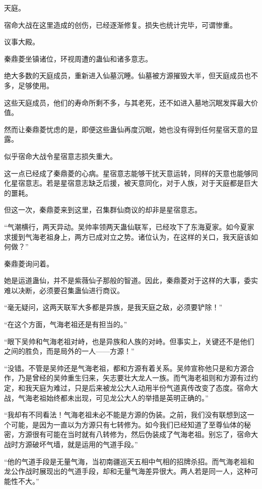 
\begin{this_body}

天庭。

宿命大战在这里造成的创伤，已经逐渐修复。损失也统计完毕，可谓惨重。

议事大殿。

秦鼎菱坐镇诸位，环视周遭的蛊仙和诸多意志。

绝大多数的天庭成员，重新进入仙墓沉睡。仙墓被方源摧毁大半，但天庭成员也不多，足够使用。

这些天庭成员，他们的寿命所剩不多，与其老死，还不如进入墓地沉眠发挥最大价值。

然而让秦鼎菱忧虑的是，即便这些蛊仙再度沉眠，她也没有得到任何星宿天意的显露。

似乎宿命大战令星宿意志损失重大。

这一点已经成了秦鼎菱的心病。星宿意志能够干扰天意运转，同样的天意也能够同化星宿意志。若是星宿意志缺乏后援，被天意同化，对于人族，对于天庭都是巨大的噩耗。

但这一次，秦鼎菱来到这里，召集群仙商议的却非是星宿意志。

“气潮横行，两天异动。吴帅率领两天蛊仙联军，已经攻下了东海夏家。如今夏家求援到气海老祖身上，两方已成对立之势。诸位认为，在这样的关口，我天庭该如何做？”

秦鼎菱询问着。

她是运道蛊仙，并不是紫薇仙子那般的智道。因此，秦鼎菱对于这样的大事，委实难以决断，必须要召集蛊仙进行商议。

“毫无疑问，这两天联军大多都是异族，是我天庭之敌，必须要铲除！”

“在这个方面，气海老祖还是有担当的。”

“眼下吴帅和气海老祖对峙，也是异族和人族的对峙。但事实上，关键还不是他们之间的胜负，而是局外的一人——方源！”

“没错。不管是吴帅还是气海老祖，都和方源有着关系。吴帅宣称他只是和方源合作，乃是曾经的吴帅重生归来，矢志要壮大龙人一族。而气海老祖则和方源有过约定，和我天庭为难过，只是后来被龙公大人动用半份气道真传改变了态度。宿命大战，气海老祖始终都未出现，可见龙公大人的举措是英明正确的。”

“我却有不同看法！气海老祖未必不能是方源的伪装。之前，我们没有联想到这一个可能，是因为一直以为方源只有七转修为。如今我们已经知道了至尊仙体的秘密，方源很有可能在当时就有八转修为，然后伪装成了气海老祖。别忘了，宿命大战时方源破坏气墙，就是运用的气道手段。”

“他的气道手段是无量气海，当初南疆巡天五相中气相的招牌杀招。而气海老祖和龙公作战时展现出的气道手段，却和无量气海差异很大。两人若是同一人，这种可能性不大。”


\end{this_body}
